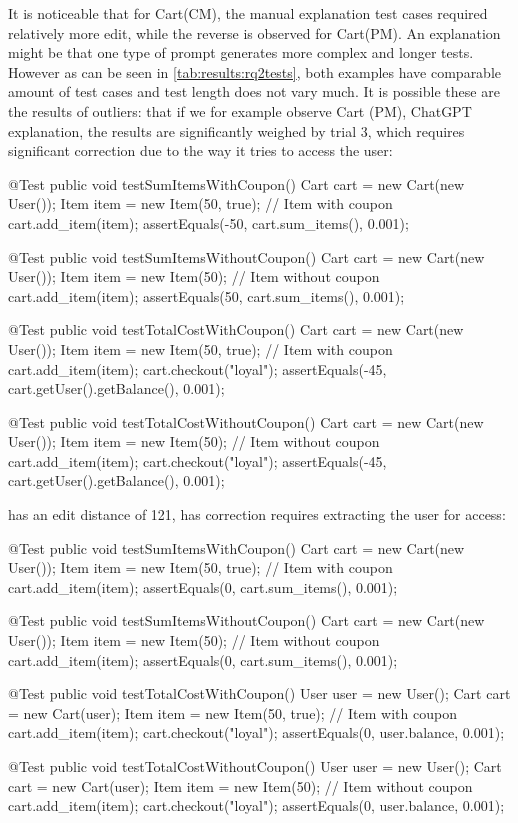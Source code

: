 It is noticeable that for Cart(CM), the manual explanation test cases required relatively more edit, while the reverse
is observed for Cart(PM). An explanation might be that one type of prompt generates more complex and longer tests. However as can be seen in
\cref{tab:results:rq2tests}, both examples have comparable amount of test cases and test length does not vary much.
It is possible these are the results of outliers: that if we for example observe Cart (PM), ChatGPT explanation, the results are significantly weighed by
trial 3, which requires significant correction due to the way it tries to access the user:
\begin{answer}
    @Test
    public void testSumItemsWithCoupon() {
        Cart cart = new Cart(new User());
        Item item = new Item(50, true); // Item with coupon
        cart.add_item(item);
        assertEquals(-50, cart.sum_items(), 0.001);
    }

    @Test
    public void testSumItemsWithoutCoupon() {
        Cart cart = new Cart(new User());
        Item item = new Item(50); // Item without coupon
        cart.add_item(item);
        assertEquals(50, cart.sum_items(), 0.001);
    }

    @Test
    public void testTotalCostWithCoupon() {
        Cart cart = new Cart(new User());
        Item item = new Item(50, true); // Item with coupon
        cart.add_item(item);
        cart.checkout("loyal");
        assertEquals(-45, cart.getUser().getBalance(), 0.001);
    }

    @Test
    public void testTotalCostWithoutCoupon() {
        Cart cart = new Cart(new User());
        Item item = new Item(50); // Item without coupon
        cart.add_item(item);
        cart.checkout("loyal");
        assertEquals(-45, cart.getUser().getBalance(), 0.001);
    }
\end{answer}
has an edit distance of 121, has correction requires extracting the user for access:
\begin{answer}
    @Test
    public void testSumItemsWithCoupon() {
        Cart cart = new Cart(new User());
        Item item = new Item(50, true); // Item with coupon
        cart.add_item(item);
        assertEquals(0, cart.sum_items(), 0.001);
    }

    @Test
    public void testSumItemsWithoutCoupon() {
        Cart cart = new Cart(new User());
        Item item = new Item(50); // Item without coupon
        cart.add_item(item);
        assertEquals(0, cart.sum_items(), 0.001);
    }

    @Test
    public void testTotalCostWithCoupon() {
        User user = new User();
        Cart cart = new Cart(user);
        Item item = new Item(50, true); // Item with coupon
        cart.add_item(item);
        cart.checkout("loyal");
        assertEquals(0, user.balance, 0.001);
    }

    @Test
    public void testTotalCostWithoutCoupon() {
        User user = new User();
        Cart cart = new Cart(user);
        Item item = new Item(50); // Item without coupon
        cart.add_item(item);
        cart.checkout("loyal");
        assertEquals(0, user.balance, 0.001);
    }
\end{answer}
